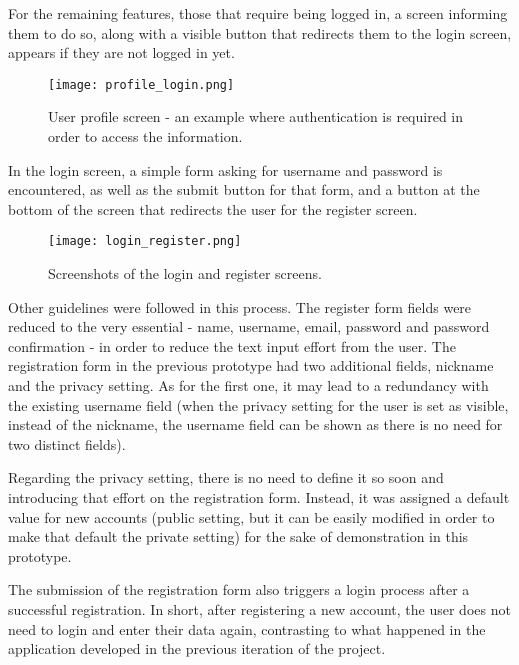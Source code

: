 For the remaining features, those that require being logged in, a screen informing them to do so, along with a visible button that redirects them to the login screen, appears if they are not logged in yet. 

\begin{figure}[h!]
  \begin{center}
    \leavevmode
    \texttt{[image: profile\_login.png]}
    \caption{User profile screen - an example where authentication is required in order to access the information.}
    \label{fig:auth1}
  \end{center}
\end{figure}

In the login screen, a simple form asking for username and password is encountered, as well as the submit button for that form, and a button at the bottom of the screen that redirects the user for the register screen.

\begin{figure}[h!]
  \begin{center}
    \leavevmode
    \texttt{[image: login\_register.png]}
    \caption{Screenshots of the login and register screens.}
    \label{fig:auth2}
  \end{center}
\end{figure}

Other guidelines were followed in this process. The register form fields were reduced to the very essential - name, username, email, password and password confirmation - in order to reduce the text input effort from the user. The registration form in the previous prototype had two additional fields, nickname and the privacy setting. As for the first one, it may lead to a redundancy with the existing username field (when the privacy setting for the user is set as visible, instead of the nickname, the username field can be shown as there is no need for two distinct fields). 

Regarding the privacy setting, there is no need to define it so soon and introducing that effort on the registration form. Instead, it was assigned a default value for new accounts (public setting, but it can be easily modified in order to make that default the private setting) for the sake of demonstration in this prototype.

The submission of the registration form also triggers a login process after a successful registration. In short, after registering a new account, the user does not need to login and enter their data again, contrasting to what happened in the application developed in the previous iteration of the project.

